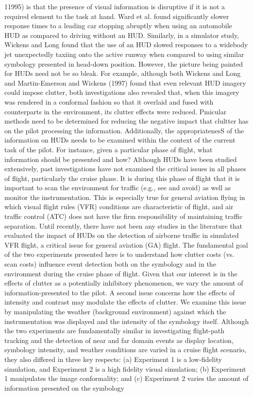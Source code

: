 \documentclass[utf8,bachelor,manualbib]{gradu3}
\begin{document}
11995) is that the presence of visual information is disruptive if it is not a required
element to the task at hand. Ward et al. found significantly slower response times
to a leading car stopping abruptly when using an automobile HUD as compared to
driving without an HUD. Similarly, in a simulator study, Wickens and Long found
that the use of an HUD slowed responses to a widebody jet unexpectedly taxiing
onto the active runway when compared to using similar symbology presented in
head-down position. However, the picture being painted for HUDs need not be so
bleak. For example, although both Wickens and Long and Martin-Emerson and
Wickens (1997) found that even relevant HUD imagery could impose clutter, both
investigations also revealed that, when this imagery was rendered in a conformal
fashion so that it overlaid and fused with counterparts in the environment, its clutter
effects were reduced. Pmicular methods need to be determined for reducing the
negative impact that clultter has on the pilot processing the information. Additionally,
the appropriatenesS of the information on HUDs needs to be examined within the context of the current task of the pilot. For instance, given a particular phase of
flight, what information should be presented and how?
Although HUDs have been studied extensively, past investigations have not
examined the critical issues in all phases of flight, particularly the cruise phase. It
is during this phase of flight that it is important to scan the environment for traffic
(e.g., see and avoid) as well as monitor the instrumentation. This is especially true
for general aviation flying in which visual flight rules (VFR) conditions are
characteristic of flight, and air traffic control (ATC) does not have the firm
responsibility of maintaining traffic separation. Until recently, there have not been
any studies in the literature that evaluated the impact of HUDs on the detection of
airborne traffic in simulated VFR flight, a critical issue for general aviation (GA)
flight. The fundamental goal of the two experiments presented here is to understand
how clutter costs (vs. scan costs) influence event detection both on the symbology
and in the environment during the cruise phase of flight. Given that our interest is
in the effects of clutter as a potentially inhibitory phenomenon, we vary the amount
of information-presented to the pilot. A second issue concerns how the effects of
intensity and contrast may modulate the effects of clutter. We examine this issue
by manipulating the weather (background environment) against which the instrumentation
was displayed and the intensity of the symbology itself. Although the
two experiments are fundamentally similar in investigating flight-path tracking and
the detection of near and far domain events as display location, symbology intensity,
and weather conditions are varied in a cruise flight scenario, they also differed in
three key respects: (a) Experiment 1 is a low-fidelity simulation, and Experiment
2 is a high fidelity visual simulation; (b) Experiment 1 manipulates the image
conformality; and (c) Experiment 2 varies the amount of information presented on
the symbology \citep{ververs1998}
\end{document}
